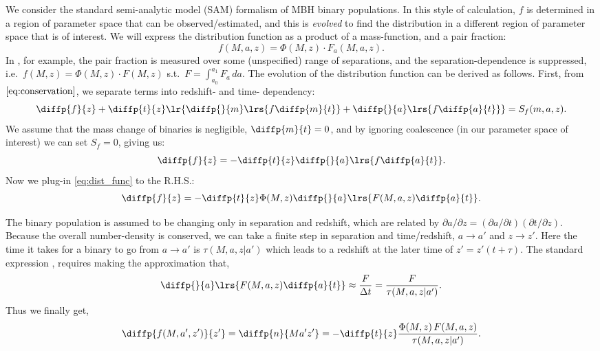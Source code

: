 \documentclass[10pt, oneside, onecolumn]{article}   	%
\begin{document}
    We consider the standard \citep[e.g.~Sesana style; see][]{Chen+2019} semi-analytic model (SAM) formalism of MBH binary populations.  In this style of calculation, $f$ is determined in a region of parameter space that can be observed/estimated, and this is \textit{evolved} to find the distribution in a different region of parameter space that is of interest.  We will express the distribution function as a product of a mass-function, and a pair fraction:
    \begin{equation}
    \label{eq:dist_func}
    f(M,a,z) = \Phi(M, z) \cdot F_a(M, a, z).
    \end{equation}
    In \citet{Chen+2019}, for example, the pair fraction is measured over some (unspecified) range of separations, and the separation-dependence is suppressed, i.e.~$f(M, z) = \Phi(M, z) \cdot F(M, z)$ s.t.~$F = \int_{a_0}^{a_1} F_a \, da$.
    The evolution of the distribution function can be derived as follows.  First, from $\eqref{eq:conservation}$, we separate terms into redshift- and time- dependency:
    \begin{equation}
    \diffp{f}{z} + \diffp{t}{z}\lr{\diffp{}{m} \lrs{f \diffp{m}{t}} + \diffp{}{a} \lrs{f \diffp{a}{t}}} = S_f(m, a, z).
    \end{equation}
    We assume that the mass change of binaries is negligible, $\diffp{m}{t} = 0$, and by ignoring coalescence (in our parameter space of interest) we can set $S_f = 0$, giving us:
    \begin{equation}
    \diffp{f}{z} = - \diffp{t}{z} \diffp{}{a} \lrs{f \diffp{a}{t}}.
    \end{equation}
    Now we plug-in \eqref{eq:dist_func} to the R.H.S.:
    \begin{equation}
    \diffp{f}{z} = - \diffp{t}{z} \Phi(M,z) \diffp{}{a} \lrs{F(M,a,z) \diffp{a}{t}}.
    \end{equation}

    The binary population is assumed to be changing only in separation and redshift, which are related by $\partial a / \partial z = (\partial a / \partial t) (\partial t / \partial z)$.  Because the overall number-density is conserved, we can take a finite step in separation and time/redshift, $a\rightarrow a'$ and $z\rightarrow z'$.  Here the time it takes for a binary to go from $a \rightarrow a'$ is $\tau(M,a,z|a')$ which leads to a redshift at the later time of $z' = z'(t + \tau)$.  The standard expression \citep[e.g.~][~Eq.~5]{Chen+2019}, requires making the approximation that,
    \begin{equation}
    \diffp{}{a} \lrs{F(M,a,z) \diffp{a}{t}} \approx \frac{F}{\Delta t} = \frac{F}{\tau(M,a,z|a')}.
    \end{equation}
    Thus we finally get,
    \begin{equation}
    \diffp{f(M,a',z')}{{z'}} = \diffp{n}{{M}{a'}{z'}} = - \diffp{t}{z} \frac{\Phi(M,z) \, F(M,a,z)}{\tau(M,a,z|a')}.
    \end{equation}
\end{document}
